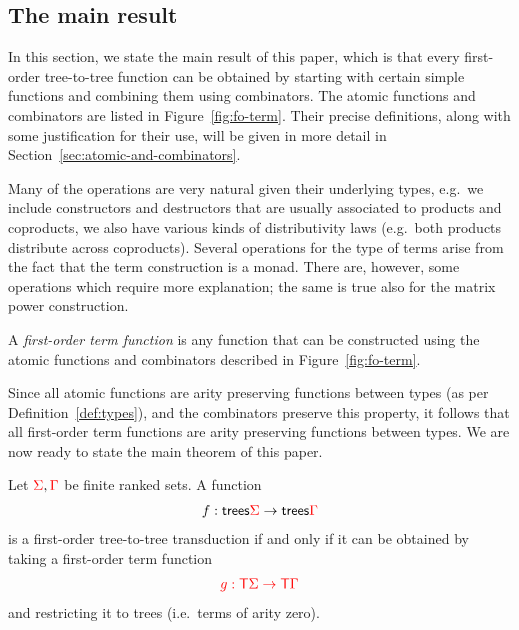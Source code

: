 \subsection{The main result}
In this section, we state the main result of this paper, which is that every first-order tree-to-tree function can be obtained by starting with certain simple functions and combining them using combinators. The atomic functions and combinators are listed in Figure~\ref{fig:fo-term}. Their precise definitions, along with some justification for their use,   will be given in more detail in Section~\ref{sec:atomic-and-combinators}.

Many of the operations are very natural given their underlying types, e.g.~we include constructors and destructors that are usually associated to products and coproducts, we also have various kinds of distributivity laws (e.g.~both products distribute across coproducts). Several operations for  the type of terms arise from the fact that the term construction is a monad. There are, however, some operations which require more explanation; the same is true also for the matrix power construction. 

\begin{definition}
    A \emph{first-order term function} is any function that can be constructed using the atomic functions and combinators described in Figure~\ref{fig:fo-term}.
\end{definition}

Since all atomic functions are arity preserving functions between types (as per Definition~\ref{def:types}), and the combinators preserve this property, it follows that all first-order term functions are arity preserving functions between types. We are now ready to state the main theorem of this paper. 

\begin{theorem}
    Let ${\color{red}{\Sigma}},{\color{red}{\Gamma}}$ be finite ranked sets. A function 
    \begin{align*}
        f : \mathsf {trees} {\color{red}{\Sigma}} \to \mathsf {trees} {\color{red}{\Gamma}}
    \end{align*}
    is a first-order tree-to-tree transduction if and only if it can be obtained by taking a first-order term function
    \begin{align*}
        {\color{red}{g : {\color{red}{\mathsf T}}\Sigma \to {\color{red}{\mathsf T}}\Gamma}}
    \end{align*}
    and restricting it to trees (i.e.~terms of arity zero).
\end{theorem}








